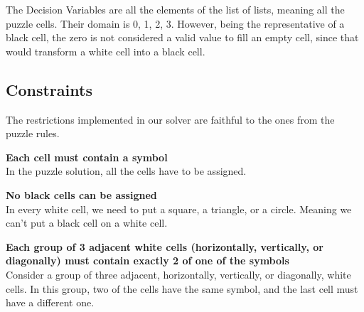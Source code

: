 \documentclass[runningheads]{llncs}
\begin{document}
The Decision Variables are all the elements of the list of lists, meaning all the puzzle cells.
Their domain is {0, 1, 2, 3}. However, being the representative of a black cell,
    the zero is not considered a valid value to fill an empty cell,
    since that would transform a white cell into a black cell.

\subsection{Constraints}
The restrictions implemented in our solver are faithful to the ones from the puzzle rules.

\textbf{Each cell must contain a symbol} \\
In the puzzle solution, all the cells have to be assigned.

\textbf{No black cells can be assigned} \\
In every white cell, we need to put a square, a triangle, or a circle.
Meaning we can't put a black cell on a white cell.

\textbf{Each group of 3 adjacent white cells (horizontally, vertically, or diagonally)
    must contain exactly 2 of one of the symbols} \\
Consider a group of three adjacent, horizontally, vertically, or diagonally, white cells.
In this group, two of the cells have the same symbol, and the last cell must have a different one.
\end{document}
